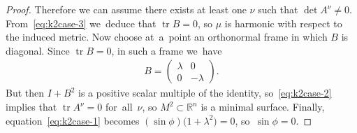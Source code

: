\documentclass[10pt,a4paper]{amsart}
\def\R{\mathbb{R}}
\def\tr{\operatorname{tr}}
\numberwithin{equation}{section}
\begin{document}
\begin{proof}
Therefore we can assume there exists at least one $\nu$ such that $\det A^{\nu} \neq 0$. From~\eqref{eq:k2case-3} we~deduce that $\tr B = 0$, so $\mu$ is harmonic with respect to the induced metric. Now choose at~a~point an orthonormal frame in which $B$ is diagonal. Since $\tr B = 0$, in such a frame we~have
\begin{gather*}
B = \begin{pmatrix} \lambda & 0 \\ 0 & - \lambda \end{pmatrix}.
\end{gather*}
But then $I + B^2$ is a positive scalar multiple of the identity, so~\eqref{eq:k2case-2} implies that $\tr A^{\nu} = 0$ for~all~$\nu$, so $M^2 \subset \R^n$ is a minimal surface. Finally, equation~\eqref{eq:k2case-1} becomes $(\sin \phi) \big(1 + \lambda^2\big) = 0$, so~$\sin \phi = 0$.
\end{proof}
\end{document}
